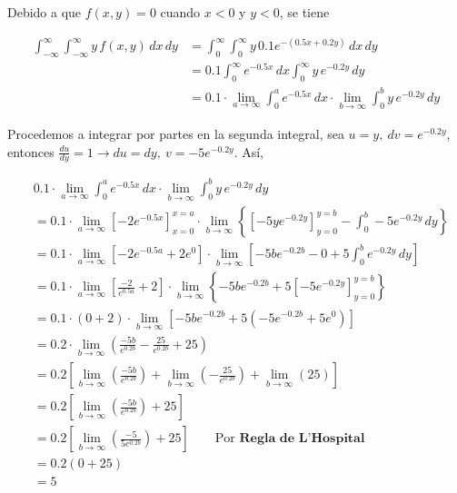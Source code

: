 \documentclass[12pt]{exam}
\begin{document}
\begin{questions}
\begin{enumerate}[a)]
\begin{enumerate}[c.a)]
      Debido a que $f(x,y)=0$ cuando $x<0$ y $y<0$, se tiene

      \begin{align*}
        \int_{-\infty}^{\infty} \int_{-\infty}^{\infty} y\,f(x,y)\,dx\,dy 
        &= \int_0^{\infty} \int_0^{\infty} y\,0.1e^{-(0.5x+0.2y)}\,dx\,dy \\
        &= 0.1 \int_0^{\infty} e^{-0.5x}\,dx \int_0^{\infty} y\,e^{-0.2y}\,dy \\
        &= 0.1 \cdot \lim_{a\to \infty}\int_0^a e^{-0.5x}\,dx \cdot \lim_{b\to \infty}\int_0^b y\,e^{-0.2y}\,dy 
      \end{align*}

      Procedemos a integrar por partes en la segunda integral, sea $u=y,~dv=e^{-0.2y}$, entonces $\frac{du}{dy}=1 \rightarrow du=dy,~v=-5e^{-0.2y}$. Así,

      \begin{align*}
        & 0.1 \cdot \lim_{a\to \infty}\int_0^a e^{-0.5x}\,dx \cdot \lim_{b\to \infty}\int_0^b y\,e^{-0.2y}\,dy \\
        &=0.1 \cdot \lim_{a\to \infty}\left[-2e^{-0.5x}\right]_{x=0}^{x=a}
        \cdot \lim_{b\to \infty} \left\{[-5ye^{-0.2y}]_{y=0}^{y=b} - \int_0^b -5e^{-0.2y} \, dy\right\}\\
        &= 0.1 \cdot \lim_{a\to \infty} \left[-2e^{-0.5a}+2e^0\right] \cdot \lim_{b\to \infty}
        \left[-5be^{-0.2b}-0+5\int_0^b e^{-0.2y}\,dy\right]\\
        &= 0.1\cdot \lim_{a\to \infty} \left[\frac{-2}{e^{0.5a}}+2\right] \cdot \lim_{b\to \infty}
        \left\{-5be^{-0.2b}+5\left[-5e^{-0.2y}\right]_{y=0}^{y=b}\right\}\\
        &= 0.1 \cdot (0+2)\cdot \lim_{b\to \infty}
        \left[-5be^{-0.2b}+5(-5e^{-0.2b}+5e^0)\right]\\
        &= 0.2 \cdot \lim_{b \to \infty} \left(\frac{-5b}{e^{0.2b}}-\frac{25}{e^{0.2b}}+25\right)\\
        &= 0.2 \left[ \lim_{b \to \infty} \left(\frac{-5b}{e^{0.2b}}\right) + \lim_{b \to \infty} \left(-\frac{25}{e^{0.2b}}\right)+\lim_{b \to \infty} \left(25\right) \right]\\
        &= 0.2 \left[ \lim_{b \to \infty} \left(\frac{-5b}{e^{0.2b}}\right) + 25 \right]\\
        &= 0.2 \left[ \lim_{b \to \infty} \left(\frac{-5}{5e^{0.2b}}\right) + 25 \right]\qquad \text{Por }\textbf{Regla de L'Hospital} \\
        &= 0.2 (0+25)\\
        &=5
      \end{align*}


\end{enumerate}
\end{enumerate}
\end{questions}
\end{document}
